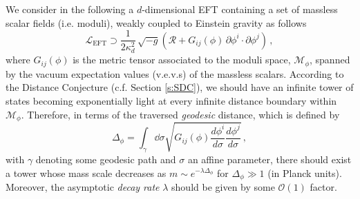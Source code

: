 We consider in the following a $d$-dimensional EFT containing a set of massless scalar fields (i.e. moduli), weakly coupled to Einstein gravity as follows
%
\begin{equation}\label{eq:action}
	\mathcal{L}_{\text{EFT}} \supset \dfrac{1}{2\kappa_d^2}\,  \sqrt{- g} \left(\mathcal{R} + G_{i j} (\phi)\, \partial \phi^i \cdot \partial \phi^j\right)\, ,
\end{equation}
%
where $G_{ij}(\phi)$ is the metric tensor associated to the moduli space, $\mathcal{M}_{\phi}$, spanned by the vacuum expectation values (v.e.v.s) of the massless scalars. According to the Distance Conjecture (c.f. Section \ref{s:SDC}), we should have an infinite tower of states becoming exponentially light at every infinite distance boundary within $\mathcal{M}_{\phi}$. Therefore, in terms of the traversed \emph{geodesic} distance, which is defined by
%
\begin{equation}\label{eq:modspacedist}
	\Delta_{\phi} = \int_{\gamma} \dd\sigma \sqrt{G_{i j} (\phi) \frac{d \phi^i}{d \sigma} \frac{d \phi^j}{d \sigma}}\, ,
\end{equation}
% 
with $\gamma$ denoting some geodesic path and $\sigma$ an affine parameter, there should exist a tower whose mass scale decreases as $m\sim e^{-\lambda \Delta_{\phi}}$ for $\Delta_{\phi} \gg 1$ (in Planck units). Moreover, the asymptotic \emph{decay rate} $\lambda$ should be given by some $\mathcal{O}(1)$ factor.


